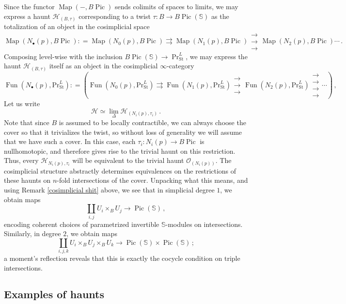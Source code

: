 \documentclass[10pt]{amsart}
\theoremstyle{plain}
\theoremstyle{definition}
\DeclareMathOperator{\Fun}{Fun}
\DeclareMathOperator{\Pic}{Pic}
\def\on{\operatorname}
\DeclareMathOperator{\Map}{Map}
\newcommand{\St}{\mathrm{St}}
\newcommand{\bS}{\mathbb{S}}
\newcommand{\cH}{\mathcal{H}}
\newcommand{\cO}{\mathcal{O}}
\begin{document}
Since the functor $\Map(-, B \Pic)$ sends colimits of spaces to limits, we may express a haunt $\cH_{(B, \tau)}$ corresponding to a twist $\tau : B \to B\Pic(\bS)$ as the totalization of an object in the cosimplicial space
\begin{equation} \label{cosimplicial_category}
   \Map(N_{\bullet}(p), B \Pic): = \Map(N_{0}(p), B \Pic) \rightrightarrows \Map(N_{1}(p), B \Pic) \substack{\rightarrow\\[-1em] \rightarrow \\[-1em] \rightarrow} \Map(N_{2}(p), B \Pic) \cdots \,.
\end{equation}
Composing level-wise with the inclusion $B\Pic(\bS) \to \on{Pr}^{L}_{\St}$, we may express the haunt $\cH_{(B, \tau)}$ itself as an object in the cosimplicial $\infty$-category
\[
\Fun(N_{\bullet}(p), \mathrm{Pr}^L_{\St}): = \left(\Fun(N_{0}(p), \mathrm{Pr}^L_{\St}) \rightrightarrows \Fun(N_{1}(p), \mathrm{Pr}^L_{\St}) \substack{\rightarrow\\[-1em] \rightarrow \\[-1em] \rightarrow} \Fun(N_{2}(p), \mathrm{Pr}^L_{\St}) \substack{\rightarrow \\[-1em] \rightarrow \\[-1em] \rightarrow \\[-1em]\rightarrow} \cdots \right) \,,
\]
Let us write
\[
\cH \simeq \lim_{\Delta} \cH_{(N_i(p),\tau_i)} \,.
\]
Note that since $B$ is assumed to be locally contractible, we can always choose the cover so that it trivializes the twist, so without loss of generality we will assume that we have such a cover.
In this case, each $\tau_i : N_i(p) \to B\Pic$ is nullhomotopic, and therefore gives rise to the trivial haunt on this restriction.
Thus, every $\cH_{N_{i}(p), \tau_i}$ will be equivalent to the trivial haunt $\cO_{(N_{i}(p))}$.
The cosimplicial structure abstractly determines equivalences on the restrictions of these haunts on $n$-fold intersections of the cover.
Unpacking what this means, and using Remark \ref{cosimplicial shit} above, we see that in simplicial degree $1$, we obtain maps
 \[
\coprod_{i,j} U_i \times_{B} U_j \to  \Pic(\bS) \,,
 \]
 encoding coherent choices of parametrized  invertible $\bS$-modules on intersections.
Similarly, in degree $2$, we obtain maps
\[
\coprod_{i,j,k} U_i \times_{B} U_j \times_{B} U_k \to  \Pic(\bS) \times \Pic(\bS) \,;
\]
a moment's reflection reveals that this is exactly the cocycle condition on triple intersections.

\subsection{Examples of haunts} \label{section_examples_haunts}
\end{document}
